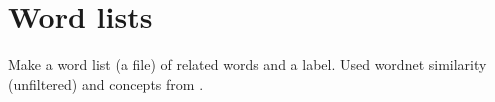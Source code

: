 \documentclass{article}
\begin{document}
\section{Word lists}

Make a word list (a file) of related words and a label. Used wordnet
similarity (unfiltered) and concepts from \cite{5072519}.
\end{document}
